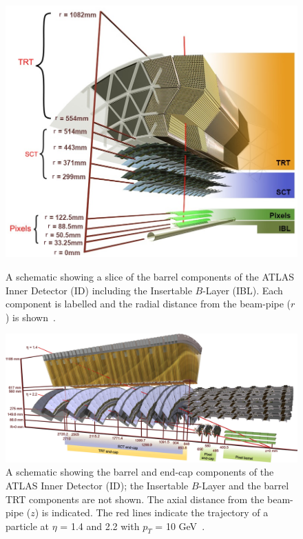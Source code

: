 \begin{figure}[!b]
  \begin{center}
    \includegraphics[width=0.7\linewidth, angle=0]{figs/Detector/ID_slice.png}
  \end{center}
  \caption[A schematic showing a slice of the barrel components of the ATLAS Inner Detector including the Insertable $B$-Layer.]
          {A schematic showing a slice of the barrel components of the ATLAS Inner Detector (ID) including the Insertable $B$-Layer (IBL).
            Each component is labelled and the radial distance from the beam-pipe ($r$) is shown~\cite{obj-tracks_TIDE}.}
  \label{fig:det-ID_slice}

  \begin{center}
    \includegraphics[width=0.9\linewidth, angle=0]{figs/Detector/ID_schem.pdf}
  \end{center}
  \caption[A schematic showing the barrel and end-cap components of the ATLAS Inner Detector.]
          {A schematic showing the barrel and end-cap components of the ATLAS Inner Detector (ID);
            the Insertable $B$-Layer and the barrel TRT components are not shown.
            The axial distance from the beam-pipe ($z$) is indicated.
            The red lines indicate the trajectory of a particle at $\eta$ = 1.4 and 2.2 with $p_T$ = 10 GeV~\cite{det-ATLAS_Exp}.}
  \label{fig:det-ID_schem}
\end{figure}


